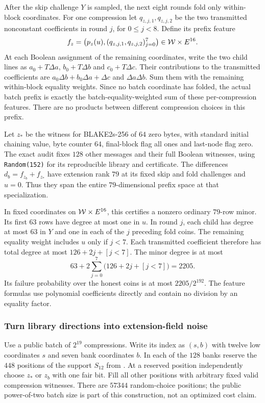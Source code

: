 After the skip challenge $Y$ is sampled, the next eight rounds fold only within-block coordinates. For one compression let $q_{z,j,1},q_{z,j,2}$ be the two transmitted nonconstant coefficients in round $j$, for $0\le j<8$. Define its prefix feature
\[
 f_z=\bigl(p_z(u),(q_{z,j,1},q_{z,j,2})_{j=0}^7\bigr)
 \in\mathcal W\times E^{16}.
\]
At each Boolean assignment of the remaining coordinates, write the two child lines as $a_0+T\Delta a$, $b_0+T\Delta b$ and $c_0+T\Delta c$. Their contributions to the transmitted coefficients are $a_0\Delta b+b_0\Delta a+\Delta c$ and $\Delta a\Delta b$. Sum them with the remaining within-block equality weights. Since no batch coordinate has folded, the actual batch prefix is exactly the batch-equality-weighted sum of these per-compression features. There are no products between different compression choices in this prefix.

Let $z_*$ be the witness for BLAKE2s-256 of $64$ zero bytes, with standard initial chaining value, byte counter $64$, final-block flag all ones and last-node flag zero. The exact audit fixes $128$ other messages and their full Boolean witnesses, using \texttt{Random(152)} for its reproducible library and certificate. The differences $d_b=f_{z_b}+f_{z_*}$ have extension rank $79$ at its fixed skip and fold challenges and $u=0$. Thus they span the entire $79$-dimensional prefix space at that specialization.

In fixed coordinates on $\mathcal W\times E^{16}$, this certifies a nonzero ordinary $79$-row minor. Its first $63$ rows have degree at most one in $u$. In round $j$, each child has degree at most $63$ in $Y$ and one in each of the $j$ preceding fold coins. The remaining equality weight includes $u$ only if $j<7$. Each transmitted coefficient therefore has total degree at most $126+2j+[j<7]$. The minor degree is at most
\[
 63+2\sum_{j=0}^7\bigl(126+2j+[j<7]\bigr)=2205.
\]
Its failure probability over the honest coins is at most $2205/2^{192}$. The feature formulas use polynomial coefficients directly and contain no division by an equality factor.

\subsubsection{Turn library directions into extension-field noise}

Use a public batch of $2^{19}$ compressions. Write its index as $(s,b)$ with twelve low coordinates $s$ and seven bank coordinates $b$. In each of the $128$ banks reserve the $448$ positions of the support $S_{12}$ from . At a reserved position independently choose $z_*$ or $z_b$ with one fair bit. Fill all other positions with arbitrary fixed valid compression witnesses. There are $57344$ random-choice positions; the public power-of-two batch size is part of this construction, not an optimized cost claim.


